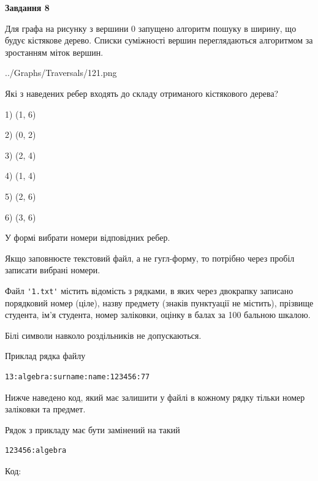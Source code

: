 \documentclass[12pt, ukrainian]{article}
\def\code#1{\Verb!#1!}
\begin{document}
{\begin {large}
{\begin {center}\textbf{Завдання 8}\end {center}}\par
Для графа на рисунку з вершини 0 запущено алгоритм пошуку в ширину, що будує кістякове дерево. Списки суміжності вершин переглядаються алгоритмом за зростанням міток вершин.\par
\begin{center}
	{../Graphs/Traversals/121.png}
\end{center}
\par Які з наведених ребер входять до складу отриманого кістякового дерева?\par
1) (1, 6)\par
2) (0, 2)\par
3) (2, 4)\par
4) (1, 4)\par
5) (2, 6)\par
6) (3, 6)\par
{\vskip 15pt} У формі вибрати номери відповідних ребер.


Якщо заповнюєте текстовий файл, а не гугл-форму, то потрібно через пробіл записа\-ти вибрані номери.\par
\newpage


Файл \code{'1.txt'} містить відомість з рядками, в яких через двокрапку записано поряд\-ковий номер (ціле), назву предмету (знаків пунктуації не містить), прізвище студента, ім'я студента, номер заліковки, оцінку в балах за 100 бальною шкалою.

Білі символи навколо роздільників не допускаються.

Приклад рядка файлу



\begin{verbatim}
13:algebra:surname:name:123456:77
\end{verbatim}


Нижче наведено код, який має залишити у файлі в кожному рядку тільки номер заліковки та предмет.

Рядок з прикладу має бути замінений на такий



\begin{verbatim}
123456:algebra
\end{verbatim}




Код:




\end{large}}
\end{document}
